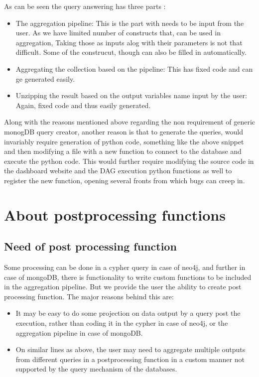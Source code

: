\documentclass[letterpaper,10pt,english]{sphinxmanual}
\begin{document}
As can be seen the query answering has three parts :
\begin{itemize}
\item {} 
The aggregation pipeline: This is the part with needs to be input from the user. As we have limited number of constructs that, can be used in aggregation, Taking those as inputs alog with their parameters is not that difficult. Some of the construcut, though can also be filled in automatically.

\item {} 
Aggregating the collection based on the pipeline: This has fixed code and can ge generated easily.

\item {} 
Unzipping the result based on the output variables name input by the user: Again, fixed code and thus easily generated.

\end{itemize}

Along with the reasons mentioned above regarding the non requirement of generic monogDB query creator, another reason is that to generate the queries, would invariably require generation of python code, something like the above snippet and then modifying a file with a new function to connect to the database and execute the python code. This would further require modifying the source code in the dashboard website and the DAG execution python functions as well to register the new function, opening several fronts from which bugs can creep in.


\chapter{About postprocessing functions}
\label{\detokenize{postprocessing:about-postprocessing-functions}}\label{\detokenize{postprocessing::doc}}

\section{Need of post processing function}
\label{\detokenize{postprocessing:need-of-post-processing-function}}
Some processing can be done in a cypher query in case of neo4j, and further in case of mongoDB, there is functionality to write custom functions to be included in the aggregation pipeline. But we provide the user the ability to create post processing function. The major reasons behind this are:
\begin{itemize}
\item {} 
It may be easy to do some projection on data output by a query post the execution, rather than coding it in the cypher in case of neo4j, or the aggregation pipeline in case of mongoDB.

\item {} 
On similar lines as above, the user may need to aggregate multiple outputs from different queries in a postprocessing function in a custom manner not supported by the query mechanism of the databases.

\end{itemize}
\end{document}
